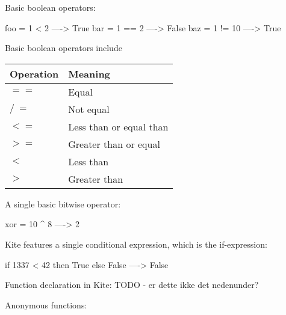 Basic boolean operators:
\begin{kite}
  
  foo = 1 < 2  ----> True
  bar = 1 == 2 ----> False
  baz = 1 != 10 ----> True
\end{kite}
Basic boolean operators include 
\begin{table}[H]
\centering
    \begin{tabular}{|l|l|}
    \hline
    Operation & Meaning                 \\ \hline
    $==$        & Equal                   \\ \hline
    $/\ =$        & Not equal               \\ \hline
    $<=$        & Less than or equal than \\ \hline
    $>=$        & Greater than or equal   \\ \hline
    $<$         & Less than               \\ \hline
    $>$         & Greater than            \\ \hline
    \end{tabular}
\end{table}

A single basic bitwise operator:
\begin{kite}
  
  xor = 10 ^ 8 ----> 2
\end{kite}

Kite features a single conditional expression, which is the if-expression:
\begin{kite}

  if 1337 < 42 then True else False ----> False
\end{kite}


Function declaration in Kite: TODO - er dette ikke det nedenunder?

Anonymous functions:

